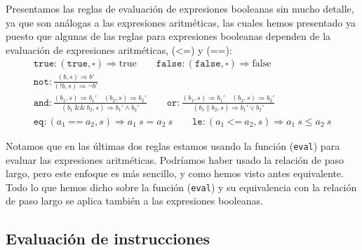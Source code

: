 \documentclass[
  a4paper, 
  10pt, 
  parskip=half, 
  toc=bibliography,
]{scrbook}
\theoremstyle{definition}
\theoremstyle{bolddef}
\newcommand{\funfont}[1]{\texttt{#1}}
\newcommand{\placeholder}{\square}
\newcommand{\LeanTrue}{\text{true}}
\newcommand{\LeanFalse}{\text{false}}
\newcommand{\ImpNot}{\texttt{!}}
\newcommand{\ImpAnd}{\mathbin{\texttt{\&\&}}}
\newcommand{\ImpOr}{\mathbin{\texttt{||}}}
\newcommand{\ImpEq}{\mathbin{\texttt{==}}}
\newcommand{\ImpLe}{\mathbin{\texttt{<=}}}
\newcommand{\ImpTrue}{\texttt{true}}
\newcommand{\ImpFalse}{\texttt{false}}
\newcommand{\bigstep}{\Longrightarrow}
\begin{document}
Presentamos las reglas de evaluación de expresiones booleanas sin mucho detalle,
ya que son análogas a las expresiones aritméticas, las cuales hemos presentado
ya puesto que algunas de las reglas para expresiones booleanas dependen de la
evaluación de expresiones aritméticas, (\(\ImpLe\)) y (\(\ImpEq\)):
\[
\begin{gathered}
  \funfont{true}: (\ImpTrue, \placeholder) \bigstep \LeanTrue \qquad
  \funfont{false}: (\ImpFalse, \placeholder) \bigstep \LeanFalse \\
  \funfont{not}: \frac{(b, s) \bigstep b'}{(\ImpNot b, s) \bigstep \lnot b'} \\
  \funfont{and}: \frac{(b_1, s) \bigstep b_1' \quad (b_2, s) \bigstep b_2'}
    {(b_1 \ \ImpAnd \ b_2, s) \bigstep b_1' \land b_2'} \qquad
  \funfont{or}: \frac{(b_1, s) \bigstep b_1' \quad (b_2, s) \bigstep b_2'}
    {(b_1 \ \ImpOr \ b_2, s) \bigstep b_1' \lor b_2'} \\
  \funfont{eq}: (a_1 \ \ImpEq \ a_2, s) \bigstep a_1 \ s = a_2 \ s \qquad
  \funfont{le}: (a_1 \ \ImpLe \ a_2, s) \bigstep a_1 \ s \leq a_2 \ s
\end{gathered}
\]

Notamos que en las últimas dos reglas estamos usando la función
(\funfont{eval}) para evaluar las expresiones aritméticas. Podríamos haber
usado la relación de paso largo, pero este enfoque es más sencillo, y como hemos
visto antes equivalente. Todo lo que hemos dicho sobre la función
(\funfont{eval}) y su equivalencia con la relación de paso largo se aplica también 
a las expresiones booleanas.

\subsection{Evaluación de instrucciones}
\end{document}
